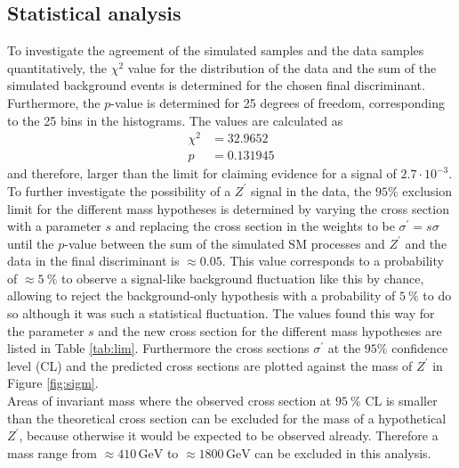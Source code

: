 \subsection{Statistical analysis}
To investigate the agreement of the simulated samples and the data samples quantitatively, the $\chi^2$ value for the distribution of the
data and the sum of the simulated background events is determined for the chosen final discriminant. Furthermore, the $p$-value is
determined for 25 degrees of freedom, corresponding to the 25 bins in the histograms.
The values are calculated as
\begin{align*}
  \chi^2 &= 32.9652 \\
  p &= 0.131945
\end{align*}
and therefore, larger than the limit for claiming evidence for a signal of $2.7 \cdot 10^{-3}$.
To further investigate the possibility of a $Z^\prime$ signal in the data, the $95 \%$ exclusion limit for the different mass hypotheses
is determined by varying the cross section with a parameter $s$ and replacing the cross section in the weights to be $\sigma^\prime = s \sigma$
until the $p$-value between the sum of the simulated SM processes and $Z^\prime$ and the data in the final discriminant is
$\approx 0.05$. This value corresponds to a probability of $\approx\SI{5}{\percent}$ to observe a signal-like background fluctuation like this by chance, allowing to reject the background-only hypothesis with a probability of $\SI{5}{\percent}$ to do so although it was such a statistical fluctuation. The values found this way for the parameter $s$ and the new cross section for the different mass hypotheses are listed in Table \ref{tab:lim}.
Furthermore the cross sections $\sigma^\prime$ at the $95 \%$ confidence level (CL) and the predicted cross sections are plotted against the mass of $Z^\prime$
in Figure \ref{fig:sigm}.\\
Areas of invariant mass where the observed cross section at $\SI{95}{\percent}$ CL is smaller than the theoretical cross section can be excluded for the mass of
a hypothetical $Z^\prime$, because otherwise it would be expected to be observed already. Therefore a mass range from $\approx 410 \, \si{\giga\eV}$ to $\approx 1800 \, \si{\giga\eV}$ can be excluded in this analysis.

